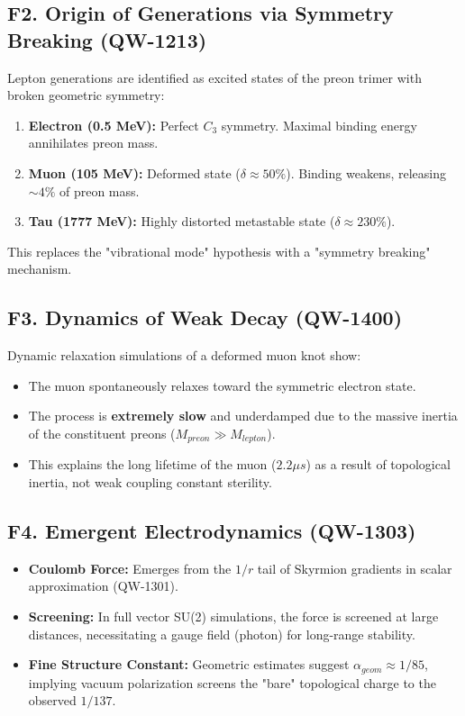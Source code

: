 \documentclass[11pt,a4paper]{book}
\theoremstyle{remark}
\begin{document}
\subsection{F2. Origin of Generations via Symmetry Breaking (QW-1213)}
Lepton generations are identified as excited states of the preon trimer with broken geometric symmetry:
\begin{enumerate}
    \item \textbf{Electron (0.5 MeV):} Perfect $C_3$ symmetry. Maximal binding energy annihilates preon mass.
    \item \textbf{Muon (105 MeV):} Deformed state ($\delta \approx 50\%$). Binding weakens, releasing $\sim 4\%$ of preon mass.
    \item \textbf{Tau (1777 MeV):} Highly distorted metastable state ($\delta \approx 230\%$).
\end{enumerate}
This replaces the "vibrational mode" hypothesis with a "symmetry breaking" mechanism.

\subsection{F3. Dynamics of Weak Decay (QW-1400)}
Dynamic relaxation simulations of a deformed muon knot show:
\begin{itemize}
    \item The muon spontaneously relaxes toward the symmetric electron state.
    \item The process is \textbf{extremely slow} and underdamped due to the massive inertia of the constituent preons ($M_{preon} \gg M_{lepton}$).
    \item This explains the long lifetime of the muon ($2.2 \mu s$) as a result of topological inertia, not weak coupling constant sterility.
\end{itemize}

\subsection{F4. Emergent Electrodynamics (QW-1303)}
\begin{itemize}
    \item \textbf{Coulomb Force:} Emerges from the $1/r$ tail of Skyrmion gradients in scalar approximation (QW-1301).
    \item \textbf{Screening:} In full vector SU(2) simulations, the force is screened at large distances, necessitating a gauge field (photon) for long-range stability.
    \item \textbf{Fine Structure Constant:} Geometric estimates suggest $\alpha_{geom} \approx 1/85$, implying vacuum polarization screens the "bare" topological charge to the observed $1/137$.
\end{itemize}
\end{document}
